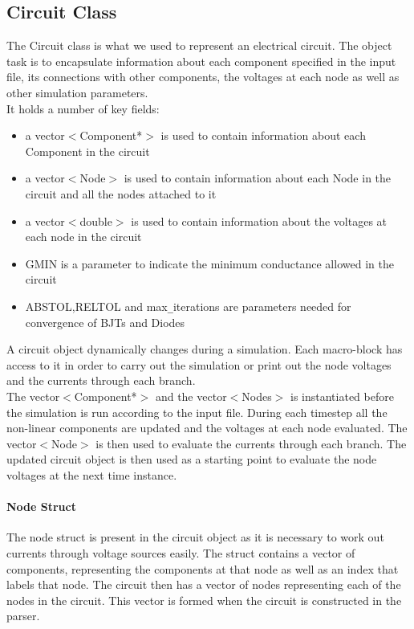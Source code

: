 \documentclass{article}
\begin{document}
\newpage
\subsection{Circuit Class}
The Circuit class is what we used to represent an electrical circuit. The object task is to encapsulate information about each component specified in the input file, its connections with other components, the voltages at each node as well as other simulation parameters.\\
It holds a number of key fields:
\medbreak
\noindent\begin{minipage}{.5\linewidth}
\begin{itemize}
    \item a vector$<$Component*$>$ is used to contain information about each Component in the circuit
    \item a vector$<$Node$>$ is used to contain information about each Node in the circuit and all the nodes attached to it
    \item a vector$<$double$>$ is used to contain information about the voltages at each node in the circuit
\end{itemize}
\end{minipage}%
\begin{minipage}{.5\linewidth}
\begin{itemize}\break
    \item GMIN is a parameter to indicate the minimum conductance allowed in the circuit
    \item ABSTOL,RELTOL and max\verb|_|iterations are parameters needed for convergence of BJTs and Diodes
\end{itemize}
\end{minipage}
\bigbreak
A circuit object dynamically changes during a simulation. Each macro-block has access to it in order to carry out the simulation or print out the node voltages and the currents through each branch.\\
The vector$<$Component*$>$ and the vector$<$Nodes$>$ is instantiated before the simulation is run according to the input file. During each timestep all the non-linear components are updated and the voltages at each node evaluated. The vector$<$Node$>$ is then used to evaluate the currents through each branch. The updated circuit object is then used as a starting point to evaluate the node voltages at the next time instance.
\paragraph{Node Struct}
The node struct is present in the circuit object as it is necessary to work out currents through voltage sources easily. The struct contains a vector of components, representing the components at that node as well as an index that labels that node. The circuit then has a vector of nodes representing each of the nodes in the circuit. This vector is formed when the circuit is constructed in the parser. 
\end{document}
